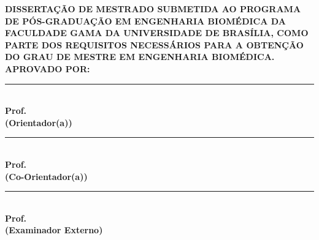 \begin{folhadeaprovacao}
\begin{center}
    \vspace*{0in}
	{\textbf{\imprimirinstituicao}}
	\par
	{\textbf{\imprimirdepartamento}}

	\vspace{0.5 in}
	{\textbf{\large \imprimirtitulo}}
    	\vspace{0.25 in}
    	\par
         {\textbf{\large \imprimirautor}}
    	\vspace{0.25 in}
\end{center}
\textbf{DISSERTAÇÃO DE MESTRADO SUBMETIDA AO PROGRAMA DE PÓS-GRADUAÇÃO EM ENGENHARIA BIOMÉDICA DA FACULDADE GAMA DA
UNIVERSIDADE DE BRASÍLIA, COMO PARTE DOS REQUISITOS NECESSÁRIOS PARA A OBTENÇÃO DO GRAU DE MESTRE EM
ENGENHARIA BIOMÉDICA.}
\flushleft	
	\vspace{0.5 in}    
    \textbf{APROVADO POR:}\\
    \vspace{0.5 in}    
    \rule{10cm}{.1mm}\\
    {\textbf{Prof. \imprimirorientador} \\ \textbf{(Orientador(a))} }\\
    \vspace{0.5 in}    
   \rule{10cm}{.1mm}\\ 
   {\textbf{Prof. \imprimirmembroCoorientador} \\ \textbf{(Co-Orientador(a))}}\\
    \vspace{0.5 in}    
   \rule{10cm}{.1mm}\\
    {\textbf{Prof. \imprimirmembroconvidadodois} \\ \textbf{(Examinador Externo)}}\\
    
    \end{folhadeaprovacao}
